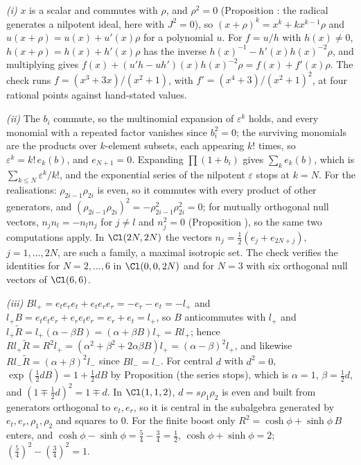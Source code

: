 \emph{(i)} $x$ is a scalar and commutes with $\rho$, and $\rho^{2} = 0$ (Proposition : the radical generates a nilpotent ideal, here with $J^{2} = 0$), so $(x + \rho)^{k} = x^{k} + kx^{k-1}\rho$ and $u(x + \rho) = u(x) + u'(x)\rho$ for a polynomial $u$. For $f = u/h$ with $h(x) \ne 0$, $h(x + \rho) = h(x) + h'(x)\rho$ has the inverse $h(x)^{-1} - h'(x)h(x)^{-2}\rho$, and multiplying gives $f(x) + (u'h - uh')(x)h(x)^{-2}\rho = f(x) + f'(x)\rho$. The check runs $f = (x^{3} + 3x)/(x^{2} + 1)$, with $f' = (x^{4} + 3)/(x^{2} + 1)^{2}$, at four rational points against hand-stated values.

\emph{(ii)} The $b_{i}$ commute, so the multinomial expansion of $\varepsilon^{k}$ holds, and every monomial with a repeated factor vanishes since $b_{i}^{2} = 0$; the surviving monomials are the products over $k$-element subsets, each appearing $k!$ times, so $\varepsilon^{k} = k!\,e_{k}(b)$, and $e_{N+1} = 0$. Expanding $\prod(1 + b_{i})$ gives $\sum_{k}e_{k}(b)$, which is $\sum_{k \le N}\varepsilon^{k}/k!$, and the exponential series of the nilpotent $\varepsilon$ stops at $k = N$. For the realisations: $\rho_{2i-1}\rho_{2i}$ is even, so it commutes with every product of other generators, and $(\rho_{2i-1}\rho_{2i})^{2} = -\rho_{2i-1}^{2}\rho_{2i}^{2} = 0$; for mutually orthogonal null vectors, $n_{j}n_{l} = -n_{l}n_{j}$ for $j \ne l$ and $n_{j}^{2} = 0$ (Proposition ), so the same two computations apply. In $\Cl(2N,2N)$ the vectors $n_{j} = \tfrac12(e_{j} + e_{2N+j})$, $j = 1, \dots, 2N$, are such a family, a maximal isotropic set. The check verifies the identities for $N = 2, \dots, 6$ in $\Cl(0,0,2N)$ and for $N = 3$ with six orthogonal null vectors of $\Cl(6,6)$.

\emph{(iii)} $Bl_{+} = e_{t}e_{r}e_{t} + e_{t}e_{r}e_{r} = -e_{r} - e_{t} = -l_{+}$ and $l_{+}B = e_{t}e_{t}e_{r} + e_{r}e_{t}e_{r} = e_{r} + e_{t} = l_{+}$, so $B$ anticommutes with $l_{+}$ and $l_{+}\widetilde{R} = l_{+}(\alpha - \beta B) = (\alpha + \beta B)l_{+} = Rl_{+}$; hence $Rl_{+}\widetilde{R} = R^{2}l_{+} = (\alpha^{2} + \beta^{2} + 2\alpha\beta B)l_{+} = (\alpha - \beta)^{2}l_{+}$, and likewise $Rl_{-}\widetilde{R} = (\alpha + \beta)^{2}l_{-}$ since $Bl_{-} = l_{-}$. For central $d$ with $d^{2} = 0$, $\exp(\tfrac12 dB) = 1 + \tfrac12 dB$ by Proposition  (the series stops), which is $\alpha = 1$, $\beta = \tfrac12 d$, and $(1 \mp \tfrac12 d)^{2} = 1 \mp d$. In $\Cl(1,1,2)$, $d = s\rho_{1}\rho_{2}$ is even and built from generators orthogonal to $e_{t}, e_{r}$, so it is central in the subalgebra generated by $e_{t}, e_{r}, \rho_{1}, \rho_{2}$ and squares to $0$. For the finite boost only $R^{2} = \cosh\phi + \sinh\phi\,B$ enters, and $\cosh\phi - \sinh\phi = \tfrac54 - \tfrac34 = \tfrac12$, $\cosh\phi + \sinh\phi = 2$; $(\tfrac54)^{2} - (\tfrac34)^{2} = 1$.

